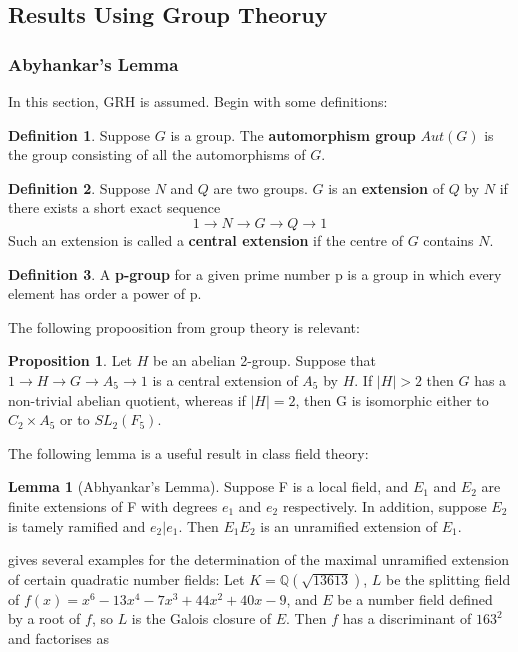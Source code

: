 \documentclass[12pt]{extarticle}
\newcommand{\Q}{\mathbb{Q}}
\newcommand{\<}{\langle}
\renewcommand{\>}{\rangle}
\theoremstyle{definition}
\newtheorem*{definition}{Definition}
\newtheorem{proposition}{Proposition}
\newtheorem{lemma}{Lemma}
\begin{document}
\subsection{Results Using Group Theoruy}
\subsubsection*{Abyhankar's Lemma}
In this section, GRH is assumed. 
Begin with some definitions:
\begin{definition}
Suppose $G$ is a group. The \textbf{automorphism group} $Aut(G)$ is the group consisting of all the automorphisms of $G$. 

\end{definition}

\begin{definition}
Suppose $N$ and $Q$ are two groups. $G$ is an \textbf{extension} of $Q$ by $N$ if there exists a short exact sequence 
\begin{equation}
1 \rightarrow N \rightarrow G \rightarrow Q \rightarrow 1 
\end{equation}
Such an extension is called a \textbf{central extension} if the centre of $G$ contains $N$. 
\end{definition}
\begin{definition}
A \textbf{p-group} for a given prime number p is a group in which every element has order a power of p.
\end{definition}
The following propoosition from group theory is relevant:
\begin{proposition}
Let $H$ be an abelian 2-group. Suppose that $1 \rightarrow H \rightarrow G \rightarrow A_5 \rightarrow 1$ is a central extension of $A_5$ by $H$. If $|H| > 2$ then $G$ has a non-trivial abelian quotient, whereas if $|H|=2$, then G is isomorphic either to $C_2 \times A_5$ or to $SL_2(F_5)$.
\end{proposition}
The following lemma is a useful result in class field theory:
\begin{lemma}[Abhyankar's Lemma]
    Suppose F is a local field, and $E_1$ and $E_2$ are finite extensions of F with degrees $e_1$ and $e_2$ respectively. In addition, suppose $E_2$ is tamely ramified and $e_2|e_1$. Then $E_1E_2$ is an unramified extension of $E_1$.
 \end{lemma}
 \cite{KIM2017} gives several examples for the determination of the maximal unramified extension of certain quadratic number fields: 
Let $K= \Q(\sqrt{13613})$,  $L$ be the splitting field of $f(x)=x^6-13x^4-7x^3 +44x^2 +40x-9$, and $E$ be a number field defined by a root of $f$, so $L$ is the Galois closure of $E$. Then $f$ has a discriminant of $163^2$ and factorises as
\end{document}
